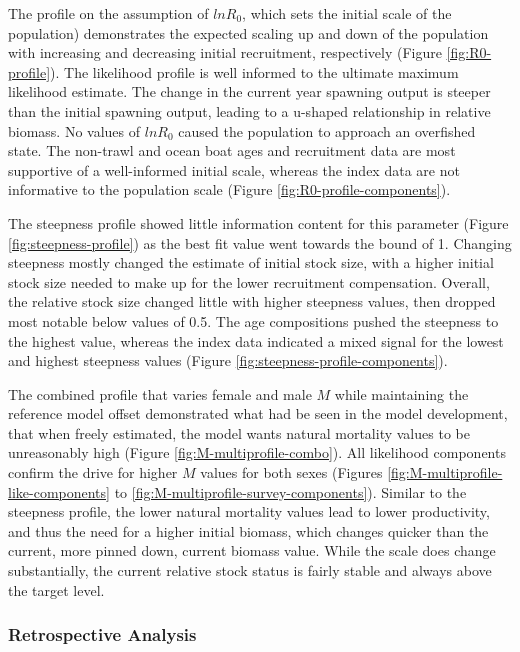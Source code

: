 \documentclass[11pt,
  letterpaper,
]{article}
\begin{document}
The profile on the assumption of \(lnR_0\), which sets the initial scale of the population) demonstrates the expected scaling up and down of the population with increasing and decreasing initial recruitment, respectively (Figure \ref{fig:R0-profile}). The likelihood profile is well informed to the ultimate maximum likelihood estimate. The change in the current year spawning output is steeper than the initial spawning output, leading to a u-shaped relationship in relative biomass. No values of \(lnR_0\) caused the population to approach an overfished state. The non-trawl and ocean boat ages and recruitment data are most supportive of a well-informed initial scale, whereas the index data are not informative to the population scale (Figure \ref{fig:R0-profile-components}).

The steepness profile showed little information content for this parameter (Figure \ref{fig:steepness-profile}) as the best fit value went towards the bound of 1. Changing steepness mostly changed the estimate of initial stock size, with a higher initial stock size needed to make up for the lower recruitment compensation. Overall, the relative stock size changed little with higher steepness values, then dropped most notable below values of 0.5. The age compositions pushed the steepness to the highest value, whereas the index data indicated a mixed signal for the lowest and highest steepness values (Figure \ref{fig:steepness-profile-components}).

The combined profile that varies female and male \(M\) while maintaining the reference model offset demonstrated what had be seen in the model development, that when freely estimated, the model wants natural mortality values to be unreasonably high (Figure \ref{fig:M-multiprofile-combo}). All likelihood components confirm the drive for higher \(M\) values for both sexes (Figures \ref{fig:M-multiprofile-like-components} to \ref{fig:M-multiprofile-survey-components}). Similar to the steepness profile, the lower natural mortality values lead to lower productivity, and thus the need for a higher initial biomass, which changes quicker than the current, more pinned down, current biomass value. While the scale does change substantially, the current relative stock status is fairly stable and always above the target level.

\hypertarget{retrospective-analysis}{%
\subsubsection{Retrospective Analysis}\label{retrospective-analysis}}
\end{document}
